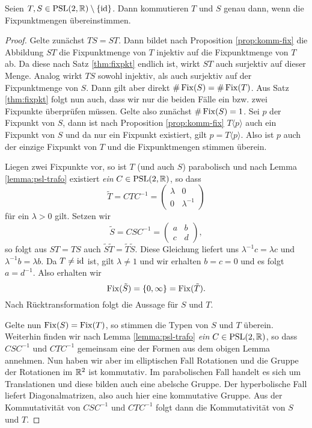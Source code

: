 \begin{thm}
  \label{thm:komm-fix}
  Seien $T,S \in \operatorname{PSL}(2, \mathbb{R})\setminus \{\operatorname{id}\}$. Dann kommutieren $T$ und $S$ genau dann,
  wenn die Fixpunktmengen übereinstimmen.
\end{thm}

\begin{proof}
  Gelte zunächst $TS = ST$. Dann bildet nach Proposition
  \ref{prop:komm-fix} die Abbildung $ST$ die Fixpunktmenge von $T$
  injektiv auf die Fixpunktmenge von $T$ ab. Da diese nach Satz
  \ref{thm:fixpkt} endlich ist, wirkt $ST$ auch surjektiv auf dieser
  Menge. Analog wirkt $TS$ sowohl injektiv, als auch surjektiv auf der
  Fixpunktmenge von $S$. Dann gilt aber direkt $\# \operatorname{Fix}(S) = \#
  \operatorname{Fix}(T)$. Aus Satz \ref{thm:fixpkt} folgt nun auch, dass wir nur die
  beiden Fälle ein bzw. zwei Fixpunkte überprüfen müssen. Gelte also
  zunächst $\# \operatorname{Fix}(S) = 1$. Sei $p$ der Fixpunkt von $S$, dann ist
  nach Proposition \ref{prop:komm-fix} $T\langle p \rangle$ auch ein
  Fixpunkt von $S$ und da nur ein Fixpunkt existiert, gilt $ p = T
  \langle p \rangle$. Also ist $p$ auch der einzige Fixpunkt von $T$
  und die Fixpunktmengen stimmen überein.

  Liegen zwei Fixpunkte vor, so ist $T$ (und auch
  $S$) parabolisch und nach Lemma \ref{lemma:psl-trafo} existiert \emph{ein}
  $C \in \operatorname{PSL}(2,\mathbb{R})$, so dass
  \[
  \tilde T = C T C^{-1} =
  \begin{pmatrix}
    \lambda & 0 \\
    0 & \lambda^{-1}
  \end{pmatrix}
  \]
  für ein $\lambda > 0$ gilt. Setzen wir
  \[
  \tilde S = C S C^{-1} =
  \begin{pmatrix}
    a & b \\
    c & d
  \end{pmatrix},
  \]
  so folgt aus $ST = TS$ auch $\tilde S \tilde T = \tilde T \tilde
  S$. Diese Gleichung liefert uns $\lambda^{-1} c = \lambda c$ und
  $\lambda^{-1} b = \lambda b$. Da $T \neq \operatorname{id}$ ist, gilt $\lambda \neq 1$ und
  wir erhalten $b = c = 0$ und es folgt $a = d^{-1}$. Also
  erhalten wir
  \[
  \operatorname{Fix}(\tilde S) = \{0, \infty\} = \operatorname{Fix}(\tilde T).
  \]
  Nach Rücktransformation folgt die Aussage für $S$ und $T$.

  Gelte nun $\operatorname{Fix}(S) = \operatorname{Fix}(T)$, so stimmen die Typen von $S$ und $T$
  überein. Weiterhin finden wir nach Lemma \ref{lemma:psl-trafo} \emph{ein} $C
  \in \operatorname{PSL}(2, \mathbb{R})$, so dass $C S C^{-1}$ und $C T C^{-1}$ gemeinsam
  eine der Formen aus dem obigen Lemma annehmen. Nun haben wir aber im
  elliptischen Fall Rotationen und die Gruppe der Rotationen im $\mathbb{R}^2$
  ist kommutativ. Im parabolischen Fall handelt es sich um
  Translationen und diese bilden auch eine abelsche Gruppe. Der
  hyperbolische Fall liefert Diagonalmatrizen, also auch hier eine
  kommutative Gruppe. Aus der Kommutativität von $C S C^{-1}$ und $C T
  C^{-1}$ folgt dann die Kommutativität von $S$ und $T$.
\end{proof}

